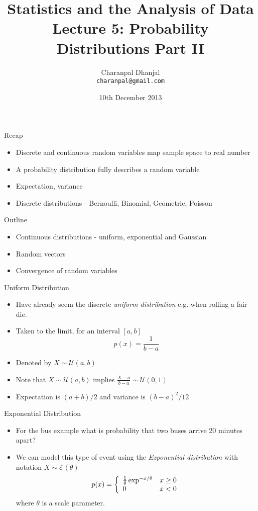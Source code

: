 \documentclass{beamer}
\title{Statistics and the Analysis of Data\\ Lecture 5: Probability Distributions Part II}
\author{Charanpal Dhanjal \\ \texttt{charanpal@gmail.com}}
\institute{\'{E}cole des Ponts}
\date{10th December 2013}
\begin{document}
\frame{\titlepage}


\begin{frame}{Recap}  
\begin{itemize} 
\item Discrete and continuous random variables map sample space to real number 
\item A probability distribution fully describes a random variable 
\item Expectation, variance 
\item Discrete distributions - Bernoulli, Binomial, Geometric, Poisson
\end{itemize}
\end{frame}

\begin{frame}{Outline} 
\begin{itemize} 
 \item Continuous distributions - uniform, exponential and Gaussian
 \item Random vectors 
 \item Convergence of random variables
\end{itemize}
\end{frame}

\begin{frame}{Uniform Distribution}  
 \begin{itemize} 
\item Have already seem the discrete \emph{uniform distribution} e.g. when rolling a fair die. 
\item Taken to the limit, for an interval $[a, b]$ 
\begin{displaymath} 
 p(x) = \frac{1}{b-a}
\end{displaymath}
\item Denoted by $X \sim \mathcal{U}(a, b)$
\item Note that  $X \sim \mathcal{U}(a, b)$ implies $\frac{X - a}{b - a} \sim \mathcal{U}(0, 1)$
\item Expectation is $(a+b)/2$ and variance is $(b-a)^2/12$ 
\end{itemize}
\end{frame}



\begin{frame}{Exponential Distribution} 
\begin{itemize} 
 \item For the bus example what is probability that two buses arrive 20 minutes apart? 
 \item We can model this type of event using the \emph{Exponential distribution} with notation $X \sim \mathcal{E}(\theta)$
 \begin{displaymath}
  p(x) = \left\{ \begin{array}{l l}\frac{1}{\theta}  \exp^{-x/\theta} & x \geq 0 \\ 0 & x < 0 \end{array} \right. 
 \end{displaymath}
  where $\theta$ is a scale parameter. 
\end{itemize}
\end{frame}
\end{document}
